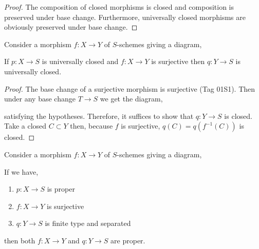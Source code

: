 \documentclass[12pt]{article}
\begin{document}
\begin{proof}
The composition of closed morphisms is closed and composition is preserved under base change. Furthermore, universally closed morphisms are obviously preserved under base change.
\end{proof}

\begin{prop}
Consider a morphism $f : X \to Y$ of $S$-schemes giving a diagram,
\begin{center}
\end{center}
If $p : X \to S$ is universally closed and $f : X \to Y$ is surjective then $q : Y \to S$ is universally closed. 
\end{prop}

\begin{proof}
The base change of a surjective morphism is surjective (Tag 01S1). Then under any base change $T \to S$ we get the diagram,
\begin{center}
\end{center}
satisfying the hypotheses. Therefore, it suffices to show that $q : Y \to S$ is closed. Take a closed $C \subset Y$ then, because $f$ is surjective, $q(C) = q(f^{-1}(C))$ is closed.
\end{proof}

\begin{cor}
Consider a morphism $f : X \to Y$ of $S$-schemes giving a diagram,
\begin{center}
\end{center}
If we have,
\begin{enumerate}
\item $p : X \to S$ is proper
\item $f : X \to Y$ is surjective 
\item $q : Y \to S$ is finite type and separated
\end{enumerate}
then both $f : X \to Y$ and $q : Y \to S$ are proper.
\end{cor}
\end{document}
